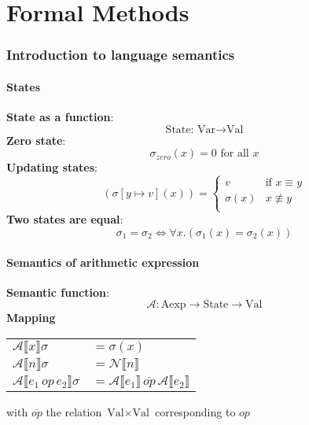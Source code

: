 \documentclass{article}
\def\li{\rightarrow}
\def\fax{\forall x.}
\def\A{\mathcal{A}}
\def\llb{\llbracket}
\def\rrb{\rrbracket}
\begin{document}
\newpage
\part*{Formal Methods}
\setcounter{section}{0}
\renewcommand*{\theHsection}{chY.\the\value{section}}

\section{Introduction to language semantics}
\subsection{States}
\textbf{State as a function}: 
$$\text{State: Var} \li \text{Val}$$ 
\textbf{Zero state}: 
$$\sigma_{zero}(x)=0\text{ for all }x$$
\textbf{Updating states}: 
$$ (\sigma[y\mapsto v](x)) = \begin{cases}
v & \text{if } x \equiv y \\
\sigma(x) & x \not\equiv y \\
\end{cases}
$$
\textbf{Two states are equal}:
$$ \sigma_1 = \sigma_2 \Leftrightarrow \fax (\sigma_1(x) = \sigma_2(x))$$

\subsection{Semantics of arithmetic expression}
\textbf{Semantic function}:
$$ \A: \text{Aexp}\li \text{State} \li \text{Val}$$
\textbf{Mapping}
\begin{center}
\begin{tabular}{l l}
    $\A \llb x\rrb \sigma$ & $= \sigma(x)$ \\
    $\A \llb n\rrb \sigma$ & $= \mathcal{N}\llb n\rrb$ \\
    $\A \llb e_1 \, op \, e_2\rrb \sigma$ & $= \A\llb e_1\rrb \, \overline{op} \, \A\llb e_2\rrb$ 
\end{tabular}
\end{center}
with $\overline{op}$ the relation $\text{Val}\times\text{Val}$ corresponding to $op$
\end{document}
